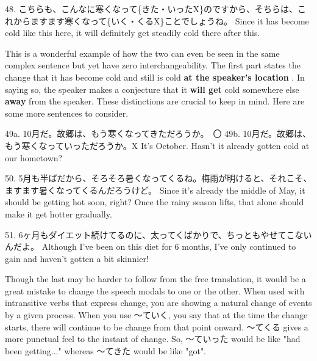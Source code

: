 \par{48. こちらも、こんなに寒くなって\{きた・いったX\}のですから、そちらは、これからますます寒くなって\{いく・くるX\}ことでしょうね。 \hfill\break
Since it has become cold like this here, it will definitely get steadily cold there after this. }

\par{ This is a wonderful example of how the two can even be seen in the same complex sentence but yet have zero interchangeability. The first part states the change that it has become cold and still is cold \textbf{at the speaker's location }. In saying so, the speaker makes a conjecture that it \textbf{will get }cold somewhere else \textbf{away }from the speaker. These distinctions are crucial to keep in mind. Here are some more sentences to consider. }

\par{49a. 10月だ。故郷は、もう寒くなってきただろうか。　〇 \hfill\break
49b. 10月だ。故郷は、もう寒くなっていっただろうか。X \hfill\break
It's October. Hasn't it already gotten cold at our hometown? }

\par{50. 5月も半ばだから、そろそろ暑くなってくるね。梅雨が明けると、それこそ、ますます暑くなってくるんだろうけど。 \hfill\break
Since it's already the middle of May, it should be getting hot soon, right? Once the rainy season lifts, that alone should make it get hotter gradually. }

\par{51. 6ヶ月もダイエット続けてるのに、太ってくばかりで、ちっともやせてこないんだよ。 \hfill\break
Although I've been on this diet for 6 months, I've only continued to gain and haven't gotten a bit skinnier! }

\par{ Though the last may be harder to follow from the free translation, it would be a great mistake to change the speech modals to one or the other. When used with intransitive verbs that express change, you are showing a natural change of events by a given process. When you use ～ていく, you say that at the time the change starts, there will continue to be change from that point onward. ～てくる gives a more punctual feel to the instant of change. So, ～ていった would be like "had been getting\dothyp{}\dothyp{}\dothyp{}" whereas ～てきた would be like "got". }
    